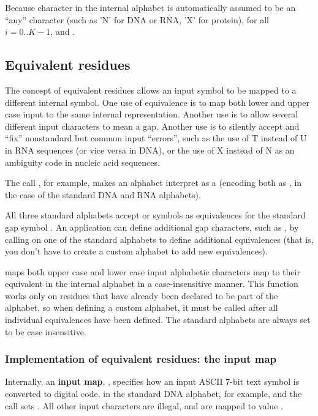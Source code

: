 Because character  in the internal alphabet is
automatically assumed to be an ``any'' character (such as 'N' for DNA
or RNA, 'X' for protein),  for all
$i=0..K-1$, and .




\subsection{Equivalent residues}

The concept of equivalent residues allows an input symbol to be mapped
to a different internal symbol.  One use of equivalence is to map both
lower and upper case input to the same internal representation.
Another use is to allow several different input characters to mean a
gap. Another use is to silently accept and ``fix'' nonstandard but
common input ``errors'', such as the use of T instead of U in RNA
sequences (or vice versa in DNA), or the use of X instead of N as an
ambiguity code in nucleic acid sequences.

The call , for example,
makes an alphabet interpret  as a  (encoding both as
, in the case of the standard DNA and RNA alphabets).
 
All three standard alphabets accept \ccode{\_} or   symbols
as equivalences for the standard gap symbol \ccode{-}. An application
can define additional gap characters, such as \ccode{,}, by calling
 on one of the standard
alphabets to define additional equivalences (that is, you don't have
to create a custom alphabet to add new equivalences).

 maps both upper case and
lower case input alphabetic characters map to their equivalent in the
internal alphabet in a case-insensitive manner.  This function works
only on residues that have already been declared to be part of the
alphabet, so when defining a custom alphabet, it must be called after
all individual equivalences have been defined. The standard alphabets
are always set to be case insensitive.

\subsubsection{Implementation of equivalent residues: the input map}

Internally, an \textbf{input map}, , specifies
how an input ASCII 7-bit text symbol is converted to digital
code.  in the standard DNA alphabet, for
example, and the call 
sets . All other input characters
are illegal, and are mapped to value .


